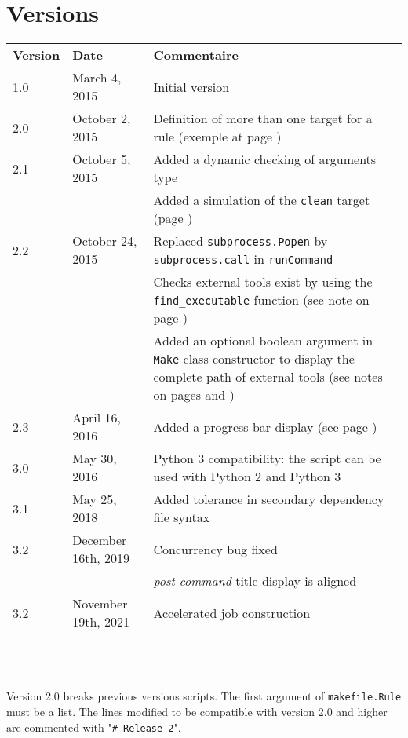 \documentclass[a4paper,11pt]{extarticle}
\begin{document}
\section{Versions}
  \begin{tabular}{llp{10.5cm}}
    \textbf{Version} & \textbf{Date} & \textbf{Commentaire}\\
    1.0 & March 4, 2015 & Initial version \\
    2.0 & October 2, 2015 & Definition of more than one target for a rule (exemple at page \pageref{plusieursCibles})\\
    2.1 & October 5, 2015 & Added a dynamic checking of arguments type\\
        &                & Added a simulation of the \texttt{clean} target (page \pageref{simulationButClean})\\
    2.2 & October 24, 2015 & Replaced \texttt{subprocess.Popen} by \texttt{subprocess.call} in \texttt{runCommand}\\
        &                & Checks external tools exist by using the \texttt{find\_executable} function (see note on page \pageref{verifUtilitaire})\\
        &                & Added an optional boolean argument in \texttt{Make} class constructor to display the complete path of external tools (see notes on pages \pageref{logUtilityToolPath} and \pageref{logUtilityToolPath2})\\
    2.3 & April 16, 2016 & Added a progress bar display (see page \pageref{affichagePourcentage})\\
    3.0 & May 30, 2016 & Python 3 compatibility: the script can be used with Python 2 and Python 3\\
    3.1 & May 25, 2018 & Added tolerance in secondary dependency file syntax\\
    3.2 & December 16th, 2019 & Concurrency bug fixed\\
        &                     & \emph{post command} title display is aligned\\
    3.2 & November 19th, 2021 & Accelerated job construction\\
  \end{tabular}
\\~

Version 2.0 breaks previous versions scripts. The first argument of \texttt{makefile.Rule} must be a list. The lines modified to be compatible with version 2.0 and higher are commented with "\texttt{\# Release 2}".

\end{document}
